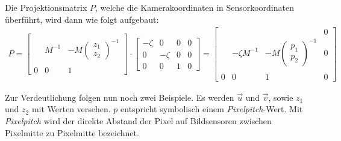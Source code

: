 		 Die Projektionsmatrix $P$, welche die Kamerakoordinaten in Sensorkoordinaten überführt, wird dann wie folgt aufgebaut:\\
		
 	\begin{gather} 		
 		P 
		=
		\begin{bmatrix}
		&&\\
		&M^{-1}& -M\begin{pmatrix}z_1\\z_2\end{pmatrix}^{-1}\\
		&&\\
		0&0&1
		\end{bmatrix}
		\cdot
		\begin{bmatrix}
		-\zeta&0&0&0\\
		0&-\zeta&0&0\\
		0&0&1&0
		\end{bmatrix}
		=
		\begin{bmatrix}
		&&&0\\
		&-\zeta M^{-1}& -M\begin{pmatrix}p_1\\p_2\end{pmatrix}^{-1}&0\\
		&&&\\
		0&0&1&0
		\end{bmatrix}
		\end{gather}
	

		
		Zur Verdeutlichung folgen nun noch zwei Beispiele. Es werden $\vec{u}$ und $\vec{v}$, sowie $z_1$ und $z_2$ mit Werten versehen. $p$ entspricht symbolisch einem \textit{Pixelpitch}-Wert. Mit \textit{Pixelpitch} wird der direkte Abstand der Pixel auf Bildsensoren zwischen Pixelmitte zu Pixelmitte bezeichnet.\\
		
